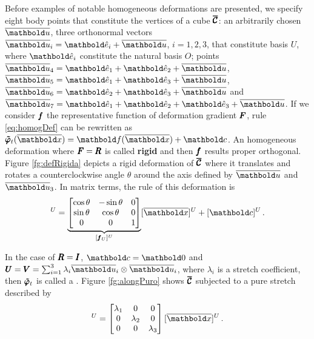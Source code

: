 \begin{example}
Before examples of notable homogeneous deformations are presented, we specify eight body points that constitute the vertices of a cube $\pmb{\overline{\mathcal{C}}}$: an arbitrarily chosen $\overline{\vto{u}}$, three orthonormal vectors $\overline{\vto{u}}_i=\vun{e}_i+\overline{\vto{u}}$, $i=1,2,3$, that constitute basis $U$, where $\vun{e}_i$ constitute the natural basis $O$; points $\overline{\vto{u}}_4=\vun{e}_1 + \vun{e}_2 + \overline{\vto{u}}$, $\overline{\vto{u}}_5=\vun{e}_1 + \vun{e}_3 + \overline{\vto{u}}$, $\overline{\vto{u}}_6=\vun{e}_2 + \vun{e}_3 + \overline{\vto{u}}$ and $\overline{\vto{u}}_7=\vun{e}_1+\vun{e}_2 + \vun{e}_3 + \overline{\vto{u}}$. If we consider $\pmb{f}$ the representative function of deformation gradient $\pmb{F}$, rule \eqref{eq:homogDef} can be rewritten as $\fua{\tnr{\tilde{\varphi}}_t}{\overline{\vto{x}}} =\fua{\vto{f}}{\overline{\vto{x}}} + \vto{c}$. An homogeneous deformation where $\pmb{F}=\pmb{R}$ is called \textbf{rigid} and then $\pmb{f}$ results proper orthogonal. Figure \ref{fg:defRigida} depicts a rigid deformation of $\pmb{\overline{\mathcal{C}}}$ where it translates and rotates a counterclockwise angle $\theta$ around the axis defined by $\overline{\vto{u}}$ and $\overline{\vto{u}}_3$. In matrix terms, the rule of this deformation is  
\begin{equation*}
[\fua{\tnr{\tilde{\varphi}}_t}{\overline{\vto{x}}}]^U=
\underbrace{\begin{bmatrix}
\cos\theta & -\sin\theta & 0\\
\sin\theta & \cos\theta & 0\\
0 & 0 & 1
\end{bmatrix}}_{[\vtf{f}_U]^U}
[\overline{\vto{x}}]^U + [\vto{c}]^U\,.
\end{equation*}


\begin{center}
\scalebox{.72}{}
\vspace{9pt}
\label{fg:defRigida}
\end{center}


In the case of $\pmb{R}=\pmb{I}$, $\vto{c}=\vto{0}$ and $\tnr{U}=\tnr{V}=\sum_{i=1}^3\lambda_{i}\overline{\vto{u}}_i\otimes\overline{\vto{u}}_i$, where $\lambda_i$ is a stretch coefficient, then $\pmb{\tilde{\varphi}}_t$ is called a . Figure \ref{fg:alongPuro} shows $\pmb{\overline{\mathcal{C}}}$ subjected to a pure stretch described by      
\begin{equation*}
[\fua{\tnr{\tilde{\varphi}}_t}{\overline{\vto{x}}}]^U=
\begin{bmatrix}
\lambda_1 & 0 & 0\\
0 & \lambda_2 & 0\\
0 & 0 & \lambda_3
\end{bmatrix}
[\overline{\vto{x}}]^U\,.
\end{equation*}


\end{example}
